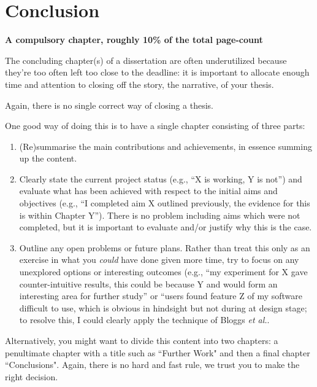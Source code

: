\documentclass[ %
                    author={Natchalin Iwsakul \\ Inkaphol Siriwongwattana \\ Tanaphan Kummaraphat \\ Patorn Srisupap},
                supervisor={Fernando Moreno-Pino},
                    degree={MSc},
                     title={Propensity Modelling for SME Commercial Lending Using Open Public Data},
                  subtitle={Companies House filings and GDELT media coverage as predictors of first-time borrowing},
                      type={},
                      year={2026}]{dissertation}
\begin{document}

\chapter{Conclusion}
\label{chap:conclusion}

{\bf A compulsory chapter,  roughly 10\% of the total page-count}
\vspace{1cm} 

\noindent
The concluding chapter(s) of a dissertation are often underutilized because they're 
too often left too close to the deadline: it is important to allocate enough time and 
attention to closing off the story, the narrative, of your thesis.

Again, there is no single correct way of closing a thesis. 

One good way of doing this is to have a single chapter consisting of three parts:

\begin{enumerate}
\item (Re)summarise the main contributions and achievements, in essence
      summing up the content.
\item Clearly state the current project status (e.g., ``X is working, Y 
      is not'') and evaluate what has been achieved with respect to the 
      initial aims and objectives (e.g., ``I completed aim X outlined 
      previously, the evidence for this is within Chapter Y'').  There 
      is no problem including aims which were not completed, but it is 
      important to evaluate and/or justify why this is the case.
\item Outline any open problems or future plans.  Rather than treat this
      only as an exercise in what you {\em could} have done given more 
      time, try to focus on any unexplored options or interesting outcomes
      (e.g., ``my experiment for X gave counter-intuitive results, this 
      could be because Y and would form an interesting area for further 
      study'' or ``users found feature Z of my software difficult to use,
      which is obvious in hindsight but not during at design stage; to 
      resolve this, I could clearly apply the technique of Bloggs {\em et al.}.
\end{enumerate}

Alternatively, you might want to divide this content into two chapters: a penultimate chapter with a title such as ``Further Work" and then a final chapter ``Conclusions". Again, there is no hard and fast rule, we trust you to make the right decision. 
\end{document}
